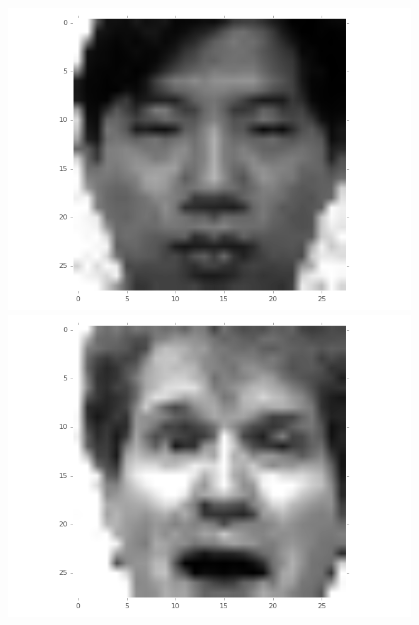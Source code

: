 \documentclass{beamer}
\begin{document}
\begin{frame}
\begin{figure}[H]
\begin{minipage}[t]{0.45\linewidth}
		\end{minipage}
	\end{figure}
	\begin{figure}[H]
		\begin{minipage}[t]{0.30\linewidth}
			\centering
			\includegraphics[width=0.95\textwidth]{img/target/subject0.png}
		\end{minipage}        
		\hspace{.1cm}
		\begin{minipage}[t]{0.30\linewidth}
			\centering
			\includegraphics[width=0.95\textwidth]{img/target/targetface.png}
		\end{minipage}
		\hspace{.1cm}
		\begin{minipage}[t]{0.30\linewidth}
			\centering

\end{minipage}
\end{figure}
\end{frame}
\end{document}
